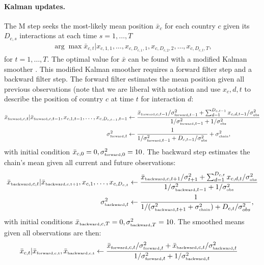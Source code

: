 \paragraph{Kalman updates.}
The M step seeks the most-likely mean position $\bar x_c$ for each
country $c$ given its $D_{c,s}$ interactions at each time $s=1, \ldots,
T$
\begin{align}
  \arg \max \bar x_{c,t} | x_{c,1,1}, \ldots, x_{c,D_{c,1},1}, x_{c,D_{c,2},2},
  \ldots, x_{c,D_{c,t},T},
\end{align}
for $t=1, \ldots, T$. The optimal value for $\bar x$ can be found with
a modified Kalman smoother \cite{kalman:1960}.  This modified Kalman
smoother requires a forward filter step and a backward filter step.
The forward filter estimates the mean position given all previous
observations (note that we are liberal with notation and use $x_c,d,t$
to describe the position of country $c$ at time $t$ for interaction
$d$:
\begin{align}
  \bar x_{\mbox{\tiny forward},c,t} | \bar x_{\mbox{\tiny forward},c,t-1}, x_{c,1,t-1}, \ldots, x_{c,D_{c,t-1},t-1}
  & \gets \frac{\bar x_{\mbox{\tiny forward},c,t-1} / \sigma_{\mbox{\tiny forward},t-1}^2
    + \sum_{d=1}^{D_{c,t-1}} x_{c,d,t-1} / \sigma_{\mbox{\tiny obs}}^2}
  {1 / \sigma_{\mbox{\tiny forward},t-1}^2 + 1 / \sigma_{\mbox{\tiny obs}}^2} \\
  \sigma_{\mbox{\tiny forward},t}^2
  & \gets \frac{1}{1 / \sigma_{\mbox{\tiny forward},t - 1}^2
    + D_{c,t-1} / \sigma_{\mbox{\tiny obs}}^2} + \sigma_{\mbox{\tiny chain}}^2,
\end{align}
with initial condition $\bar x_{c,0} = 0,
\sigma_{\mbox{\tiny forward},0}^2=10$.  The backward step estimates
the chain's mean given all current and future observations:
\begin{align}
  \bar x_{\mbox{\tiny backward},c,t} | \bar x_{\mbox{\tiny backward,c,t+1}}, x_{c,1}, \ldots, x_{c,D_{c,t}}
  & \gets \frac{\bar x_{\mbox{\tiny backward},c,t+1} / \sigma_{t+1}^2
    + \sum_{d=1}^{D_{c,t}} x_{c,d,t} / \sigma_{\mbox{\tiny obs}}^2}
  {1 / \sigma_{\mbox{\tiny backward},t-1}^2 + 1 / \sigma_{\mbox{\tiny obs}}^2} \\
  \sigma_{\mbox{\tiny backward},t}^2
  & \gets \frac{1}{1 / (\sigma_{\mbox{\tiny backward},t + 1}^2 + \sigma_{\mbox{\tiny chain}}^2)
    + D_{c,t} / \sigma_{\tiny obs}^2},
\end{align}
with initial conditions $\bar x_{\mbox{\tiny backward},c,T} = 0, \sigma_{\mbox{\tiny
    backward},T}^2=10$. The smoothed means given all observations are then:
\begin{align}
  \bar x_{c,t} | \bar x_{\mbox{\tiny forward,c,t}}, \bar x_{\mbox{\tiny backward,c,t}}
  & \gets \frac{\bar x_{\mbox{\tiny forward},c,t} / \sigma_{\mbox{\tiny forward},t}^2
    + \bar x_{\mbox{\tiny backward},c,t} / \sigma_{\mbox{\tiny backward},t}^2}
  {1 / \sigma_{\mbox{\tiny forward},t}^2
    + 1 / \sigma_{\mbox{\tiny backward},t}^2}
\end{align}

